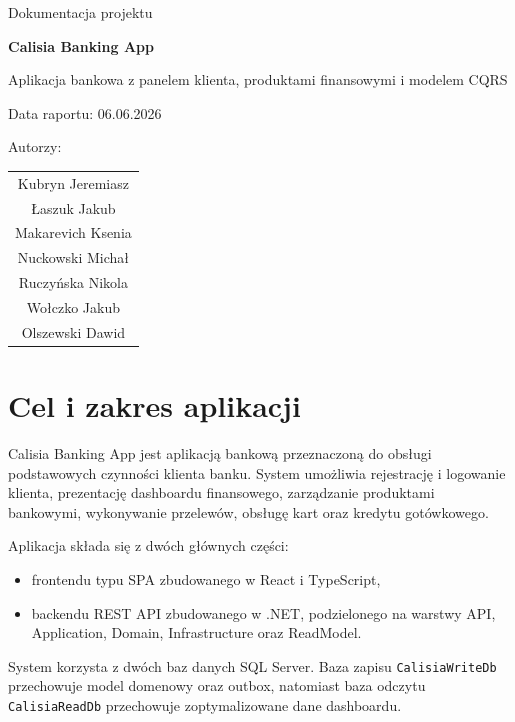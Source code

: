 \documentclass[12pt,a4paper]{article}
\begin{document}
\begin{titlepage}
\centering
{\Large Dokumentacja projektu\par}
\vspace{1.2cm}
{\Huge\bfseries Calisia Banking App\par}
\vspace{0.5cm}
{\Large Aplikacja bankowa z panelem klienta, produktami finansowymi i modelem CQRS\par}
\vfill
{\large Data raportu: 06.06.2026\par}
\vspace{1cm}
{\large Autorzy:\par}
\vspace{0.2cm}
\begin{tabular}{c}
Kubryn Jeremiasz\\
Łaszuk Jakub\\
Makarevich Ksenia\\
Nuckowski Michał\\
Ruczyńska Nikola\\
Wołczko Jakub\\
Olszewski Dawid
\end{tabular}
\vfill
\end{titlepage}

\tableofcontents
\newpage

\section{Cel i zakres aplikacji}

Calisia Banking App jest aplikacją bankową przeznaczoną do obsługi podstawowych czynności klienta banku. System umożliwia rejestrację i logowanie klienta, prezentację dashboardu finansowego, zarządzanie produktami bankowymi, wykonywanie przelewów, obsługę kart oraz kredytu gotówkowego.

Aplikacja składa się z dwóch głównych części:
\begin{itemize}
\item frontendu typu SPA zbudowanego w React i TypeScript,
\item backendu REST API zbudowanego w .NET, podzielonego na warstwy API, Application, Domain, Infrastructure oraz ReadModel.
\end{itemize}

System korzysta z dwóch baz danych SQL Server. Baza zapisu \texttt{CalisiaWriteDb} przechowuje model domenowy oraz outbox, natomiast baza odczytu \texttt{CalisiaReadDb} przechowuje zoptymalizowane dane dashboardu.
\end{document}
